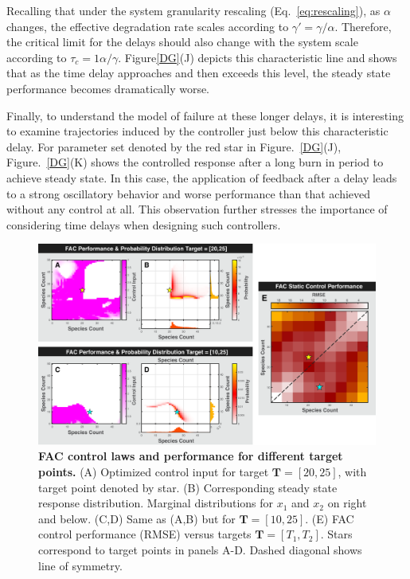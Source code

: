 \documentclass[12pt]{iopart}
\begin{document}
Recalling that under the system granularity rescaling (Eq.\ \ref{eq:rescaling}), as $\alpha$ changes, the effective degradation rate scales according to $\gamma' = \gamma/\alpha$.  Therefore, the critical limit for the delays should also change with the system scale according to $\tau_c = 1\alpha/\gamma$. Figure\ref{DG}(J) depicts this characteristic line and shows that as the time delay approaches and then exceeds this level, the steady state performance becomes dramatically worse. 

Finally, to understand the model of failure at these longer delays, it is interesting to examine trajectories induced by the controller just below this characteristic delay. For parameter set denoted by the red star in Figure.\ \ref {DG}(J), Figure.\ \ref {DG}(K) shows the controlled response after a long burn in period to achieve steady state. In this case, the application of feedback after a delay leads to a strong oscillatory behavior and worse performance than that achieved without any control at all. This observation further stresses the importance of considering time delays when designing such controllers.

\begin{figure}
\begin{center}
\includegraphics[width=1\textwidth]{StaticControl.pdf}
\vspace{-0.1in}
\caption{{\bf FAC control laws and performance for different target points.} 
(A) Optimized control input for target $\mathbf{T} = [20,25]$, with target point denoted by star. 
(B) Corresponding steady state response distribution. Marginal distributions for $x_1$ and $x_2$  on right and below.
(C,D) Same as (A,B) but for $\mathbf{T} = [10,25]$.
 (E) FAC control performance (RMSE) versus targets $\mathbf{T} = [T_1,T_2]$.  Stars correspond to target points in panels A-D. Dashed diagonal shows line of symmetry.} 
\label{CtrlP}
\end{center}
\vspace{-0.2in}
\end{figure}
\end{document}
